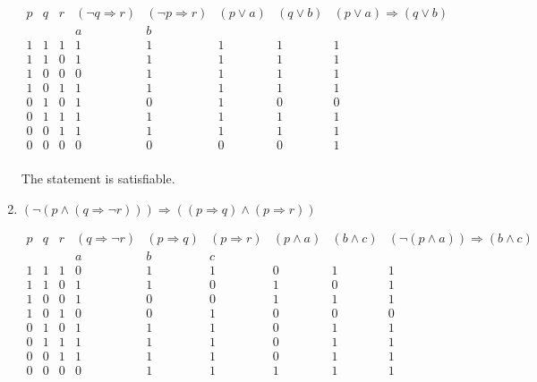 \begin{enumerate}[label=\alph*)]
        \[
            \begin{array}{cccccccc}  
                \hline
                p & q & r & (\neg q \Longrightarrow r) & (\neg p \Longrightarrow r) & (p \lor a) & (q \lor b) & (p \lor a) \Longrightarrow (q \lor b) \\
                & & & a & b & & & \\
                \hline
                1 & 1 & 1 & 1 & 1 & 1 & 1 & 1 \\
                1 & 1 & 0 & 1 & 1 & 1 & 1 & 1 \\
                1 & 0 & 0 & 0 & 1 & 1 & 1 & 1 \\
                1 & 0 & 1 & 1 & 1 & 1 & 1 & 1 \\
                0 & 1 & 0 & 1 & 0 & 1 & 0 & 0 \\
                0 & 1 & 1 & 1 & 1 & 1 & 1 & 1 \\
                0 & 0 & 1 & 1 & 1 & 1 & 1 & 1 \\
                0 & 0 & 0 & 0 & 0 & 0 & 0 & 1 \\
            \end{array}
        \]

        The statement is satisfiable. 
    \item $ (\neg (p \land (q \Longrightarrow \neg r))) \Longrightarrow ((p \Longrightarrow q) \land (p \Longrightarrow r)) $
    
        \[
            \begin{array}{ccccccccc}  
                \hline
                p & q & r & (q \Longrightarrow \neg r) & (p \Longrightarrow q) & (p \Longrightarrow r) & (p \land a) & (b \land c) & (\neg (p \land a)) \Longrightarrow (b \land c) \\
                & & & a & b & c & & & \\
                \hline
                1 & 1 & 1 & 0 & 1 & 1 & 0 & 1 & 1\\
                1 & 1 & 0 & 1 & 1 & 0 & 1 & 0 & 1\\
                1 & 0 & 0 & 1 & 0 & 0 & 1 & 1 & 1\\
                1 & 0 & 1 & 0 & 0 & 1 & 0 & 0 & 0\\
                0 & 1 & 0 & 1 & 1 & 1 & 0 & 1 & 1\\
                0 & 1 & 1 & 1 & 1 & 1 & 0 & 1 & 1\\
                0 & 0 & 1 & 1 & 1 & 1 & 0 & 1 & 1\\
                0 & 0 & 0 & 0 & 1 & 1 & 1 & 1 & 1\\
            \end{array}
        \]


\end{enumerate}

